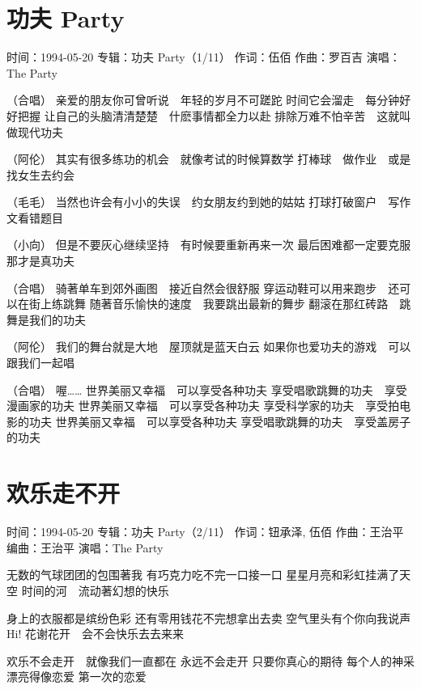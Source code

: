 \documentclass[UTF8,a4paper,oneside,twocolumn,12pt]{ctexbook}
\newcommand{\infopair}[2]{\textbullet #1：#2}
\newcommand{\zc}[1][伍佰]{\infopair{作词}{#1}}
\newcommand{\zq}[1][伍佰]{\infopair{作曲}{#1}}
\newcommand{\bq}[1][伍佰]{\infopair{编曲}{#1}}
\newcommand{\zj}[1]{\infopair{专辑}{#1}}
\newcommand{\sj}[1]{\infopair{时间}{#1}}
\newenvironment{info}{\begin{flushleft}\kaishu
	}
	{\end{flushleft}\normalsize\yahei\par}
\newenvironment{lyric}{
	}
{}
\begin{document}
\section{功夫 Party}
\begin{info}
	\sj{1994-05-20}
	\zj{功夫 Party（1/11）}
	\zc
	\zq[罗百吉]
	\infopair{演唱}{The Party}
\end{info}
\begin{lyric}
	（合唱）
	亲爱的朋友你可曾听说　年轻的岁月不可蹉跎
	时间它会溜走　每分钟好好把握
	让自己的头脑清清楚楚　什麽事情都全力以赴
	排除万难不怕辛苦　这就叫做现代功夫

	（阿伦）
	其实有很多练功的机会　就像考试的时候算数学
	打棒球　做作业　或是找女生去约会

	（毛毛）
	当然也许会有小小的失误　约女朋友约到她的姑姑
	打球打破窗户　写作文看错题目

	（小向）
	但是不要灰心继续坚持　有时候要重新再来一次
	最后困难都一定要克服　那才是真功夫

	（合唱）
	骑著单车到郊外画图　接近自然会很舒服
	穿运动鞋可以用来跑步　还可以在街上练跳舞
	随著音乐愉快的速度　我要跳出最新的舞步
	翻滚在那红砖路　跳舞是我们的功夫

	（阿伦）
	我们的舞台就是大地　屋顶就是蓝天白云
	如果你也爱功夫的游戏　可以跟我们一起唱

	（合唱）
	喔……
	世界美丽又幸福　可以享受各种功夫
	享受唱歌跳舞的功夫　享受漫画家的功夫
	世界美丽又幸福　可以享受各种功夫
	享受科学家的功夫　享受拍电影的功夫
	世界美丽又幸福　可以享受各种功夫
	享受唱歌跳舞的功夫　享受盖房子的功夫
\end{lyric}

\section{欢乐走不开}
\begin{info}
	\sj{1994-05-20}
	\zj{功夫 Party（2/11）}
	\zc[钮承泽, 伍佰]
	\zq[王治平]
	\bq[王治平]
	\infopair{演唱}{The Party}
\end{info}
\begin{lyric}
	无数的气球团团的包围著我
	有巧克力吃不完一口接一口
	星星月亮和彩虹挂满了天空
	时间的河　流动著幻想的快乐

	身上的衣服都是缤纷色彩
	还有零用钱花不完想拿出去卖
	空气里头有个你向我说声Hi!
	花谢花开　会不会快乐去去来来

	欢乐不会走开　就像我们一直都在
	永远不会走开 只要你真心的期待
	每个人的神采 漂亮得像恋爱 第一次的恋爱
\end{lyric}
\end{document}

